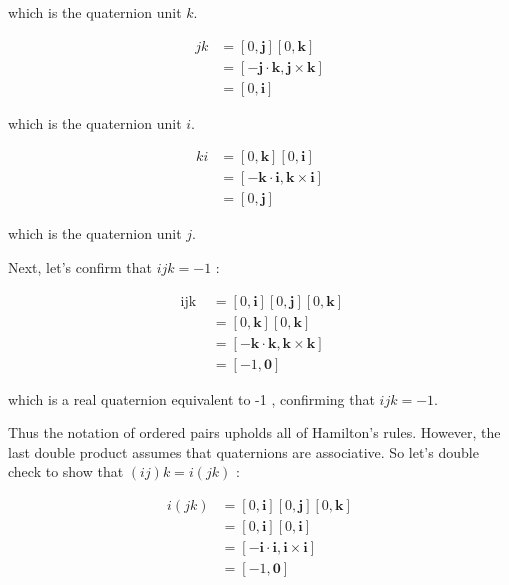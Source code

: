 which is the quaternion unit $k$.

$$
    \begin{aligned}
        j k & =[0, \mathbf{j}][0, \mathbf{k}]                               \\
            & =[-\mathbf{j} \cdot \mathbf{k}, \mathbf{j} \times \mathbf{k}] \\
            & =[0, \mathbf{i}]
    \end{aligned}
$$

which is the quaternion unit $i$.

$$
    \begin{aligned}
        k i & =[0, \mathbf{k}][0, \mathbf{i}]                               \\
            & =[-\mathbf{k} \cdot \mathbf{i}, \mathbf{k} \times \mathbf{i}] \\
            & =[0, \mathbf{j}]
    \end{aligned}
$$

which is the quaternion unit $j$.

Next, let's confirm that $i j k=-1$ :

$$
    \begin{aligned}
        \text { ijk } & =[0, \mathbf{i}][0, \mathbf{j}][0, \mathbf{k}]                \\
                      & =[0, \mathbf{k}][0, \mathbf{k}]                               \\
                      & =[-\mathbf{k} \cdot \mathbf{k}, \mathbf{k} \times \mathbf{k}] \\
                      & =[-1, \mathbf{0}]
    \end{aligned}
$$

which is a real quaternion equivalent to -1 , confirming that $i j k=-1$.

Thus the notation of ordered pairs upholds all of Hamilton's rules. However, the last double product assumes that quaternions are associative. So let's double check to show that $(i j) k=i(j k)$ :

$$
    \begin{aligned}
        i(j k) & =[0, \mathbf{i}][0, \mathbf{j}][0, \mathbf{k}]                \\
               & =[0, \mathbf{i}][0, \mathbf{i}]                               \\
               & =[-\mathbf{i} \cdot \mathbf{i}, \mathbf{i} \times \mathbf{i}] \\
               & =[-1, \mathbf{0}]
    \end{aligned}
$$

